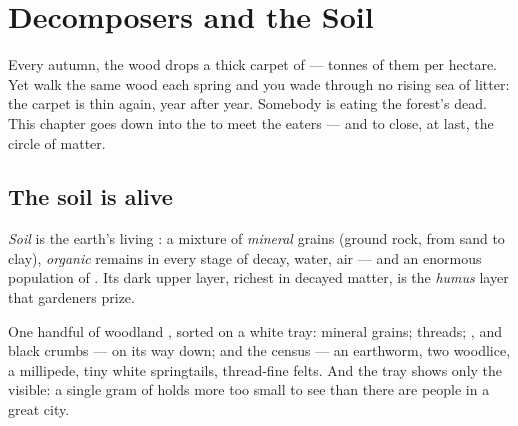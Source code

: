 \chapter{Decomposers and the Soil}\label{ch:g6:decomposers-and-soil}

Every autumn, the wood drops a thick carpet of  ---
tonnes of them per hectare. Yet walk the same wood each
spring and you wade through no rising sea of  litter: the
carpet is thin again, year after year. Somebody is eating the
forest's dead. This chapter goes down into the  to meet
the eaters --- and to close, at last, the circle of matter.

\section{The soil is alive}

\begin{definition}[Soil]\label{def:g6:decomposers-and-soil:soil}
\emph{Soil} is the earth's living : a mixture
of \emph{mineral} grains (ground rock, from sand to clay),
\emph{organic} remains in every stage of decay, water, air
--- and an enormous population of . Its dark
upper layer, richest in decayed matter, is the
\emph{humus} layer that gardeners prize.
\end{definition}

\begin{example}\label{ex:g6:decomposers-and-soil:handful}
One handful of woodland , sorted on a white tray:
mineral grains;  threads; ,  
and black crumbs ---  on its way down; and the
census --- an earthworm, two woodlice, a millipede, tiny
white springtails, thread-fine  felts. And the tray
shows only the visible: a single gram of  holds more
 too small to see than there are people in a
great city.
\end{example}

